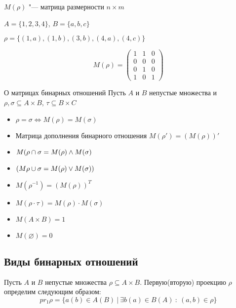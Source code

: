 $M(\rho)$ "--- матрица размерности $n \times m$

\begin{example}
    $A = \{1, 2, 3, 4\}$, $B = \{a, b, c\}$

    $\rho = \{(1, a), (1, b), (3, b), (4, a), (4, c)\}$
\end{example}


\begin{equation*}
    M(\rho) = \left( \begin{matrix}
        1 & 1 & 0 \\
        0 & 0 & 0 \\
        0 & 1 & 0 \\
        1 & 0 & 1 
    \end{matrix} \right)
\end{equation*}

\begin{theorem}{О матрицах бинарных отношений}
    Пусть $A$ и $B$ непустые множества и $\rho, \sigma \subseteq A \times B$,
    $\tau \subseteq B \times C$
    \begin{itemize}
        \item $\rho = \sigma \Leftrightarrow M(\rho) = M(\sigma)$
        \item Матрица дополнения бинарного отношения $M(\rho')
        = (M(\rho))'$
        \item $M(\rho \cap \sigma = M(\rho) \wedge M(\sigma)$
        \item $(M\rho \cup \sigma = M(\rho) \vee M(\sigma))$
        \item $M(\rho^{-1}) = (M(\rho))^T$
        \item $M(\rho \cdot \tau) = M(\rho) \cdot M(\sigma)$
        \item $M(A \times B) = 1$
        \item $M(\varnothing) = 0$
    \end{itemize}

\end{theorem}

\subsection{Виды бинарных отношений}

\begin{definition}
    Пусть $A$ и $B$ непустые множества $\rho \subseteq A \times B$.
    Первую(вторую) проекцию $\rho$ определим следующим образом:
    \begin{equation*}
        {pr_1}\rho =
         \{a(b) \in A(B) ~|~ \exists b(a) \in B(A) ~:~ (a, b) \in \rho\}
    \end{equation*}
\end{definition}

